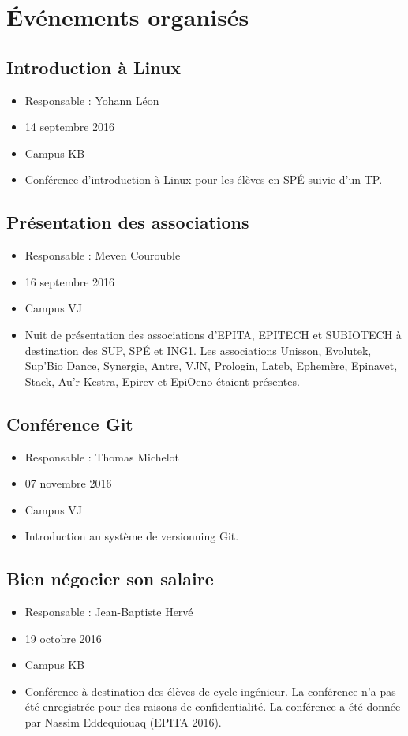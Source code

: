 \documentclass[12pt,a4paper]{article}
\begin{document}
\section{Événements organisés}
\subsection{Introduction à Linux}
\begin{itemize}
\item Responsable : Yohann Léon
\item 14 septembre 2016
\item Campus KB
\item Conférence d'introduction à Linux pour les élèves en SPÉ suivie d'un TP.
\end{itemize}

\subsection{Présentation des associations}
\begin{itemize}
\item Responsable : Meven Courouble
\item 16 septembre 2016
\item Campus VJ
\item Nuit de présentation des associations d'EPITA, EPITECH et SUBIOTECH à destination des SUP, SPÉ et ING1. Les associations Unisson, Evolutek, Sup'Bio Dance, Synergie, Antre, VJN, Prologin, Lateb, Ephemère, Epinavet, Stack, Au'r Kestra, Epirev et EpiOeno étaient présentes.
\end{itemize}

\subsection{Conférence Git}
\begin{itemize}
\item Responsable : Thomas Michelot
\item 07 novembre 2016
\item Campus VJ
\item Introduction au système de versionning Git.
\end{itemize}

\subsection{Bien négocier son salaire}
\begin{itemize}
\item Responsable : Jean-Baptiste Hervé
\item 19 octobre 2016
\item Campus KB
\item Conférence à destination des élèves de cycle ingénieur. La conférence n'a pas été enregistrée pour des raisons de confidentialité. La conférence a été donnée par Nassim Eddequiouaq (EPITA 2016).
\end{itemize}
\end{document}
